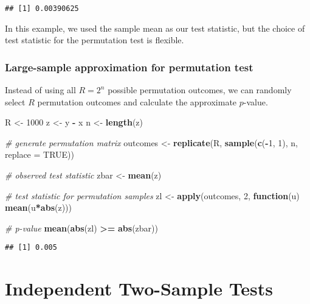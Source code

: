 \documentclass[
]{book}
\newenvironment{Shaded}{\begin{snugshade}}{\end{snugshade}}
\newcommand{\CommentTok}[1]{\textcolor[rgb]{0.56,0.35,0.01}{\textit{#1}}}
\newcommand{\ControlFlowTok}[1]{\textcolor[rgb]{0.13,0.29,0.53}{\textbf{#1}}}
\newcommand{\DataTypeTok}[1]{\textcolor[rgb]{0.13,0.29,0.53}{#1}}
\newcommand{\DecValTok}[1]{\textcolor[rgb]{0.00,0.00,0.81}{#1}}
\newcommand{\KeywordTok}[1]{\textcolor[rgb]{0.13,0.29,0.53}{\textbf{#1}}}
\newcommand{\NormalTok}[1]{#1}
\newcommand{\OperatorTok}[1]{\textcolor[rgb]{0.81,0.36,0.00}{\textbf{#1}}}
\newcommand{\OtherTok}[1]{\textcolor[rgb]{0.56,0.35,0.01}{#1}}
\newcommand{\StringTok}[1]{\textcolor[rgb]{0.31,0.60,0.02}{#1}}
\begin{document}
\begin{verbatim}
## [1] 0.00390625
\end{verbatim}

In this example, we used the sample mean as our test statistic,
but the choice of test statistic for the permutation test is flexible.

\hypertarget{large-sample-approximation-for-permutation-test}{%
\subsection{Large-sample approximation for permutation test}\label{large-sample-approximation-for-permutation-test}}

Instead of using all \(R = 2^n\) possible permutation outcomes,
we can randomly select \(R\) permutation outcomes and calculate the approximate \(p\)-value.

\begin{Shaded}
\begin{Highlighting}[]
\NormalTok{R <-}\StringTok{ }\DecValTok{1000}
\NormalTok{z <-}\StringTok{ }\NormalTok{y }\OperatorTok{-}\StringTok{ }\NormalTok{x}
\NormalTok{n <-}\StringTok{ }\KeywordTok{length}\NormalTok{(z)}

\CommentTok{# generate permutation matrix}
\NormalTok{outcomes <-}\StringTok{ }\KeywordTok{replicate}\NormalTok{(R, }\KeywordTok{sample}\NormalTok{(}\KeywordTok{c}\NormalTok{(}\OperatorTok{-}\DecValTok{1}\NormalTok{, }\DecValTok{1}\NormalTok{), n, }\DataTypeTok{replace =} \OtherTok{TRUE}\NormalTok{))}

\CommentTok{# observed test statistic}
\NormalTok{zbar <-}\StringTok{ }\KeywordTok{mean}\NormalTok{(z)}

\CommentTok{# test statistic for permutation samples}
\NormalTok{zl <-}\StringTok{ }\KeywordTok{apply}\NormalTok{(outcomes, }\DecValTok{2}\NormalTok{, }\ControlFlowTok{function}\NormalTok{(u) }\KeywordTok{mean}\NormalTok{(u}\OperatorTok{*}\KeywordTok{abs}\NormalTok{(z)))}

\CommentTok{# p-value}
\KeywordTok{mean}\NormalTok{(}\KeywordTok{abs}\NormalTok{(zl) }\OperatorTok{>=}\StringTok{ }\KeywordTok{abs}\NormalTok{(zbar))}
\end{Highlighting}
\end{Shaded}

\begin{verbatim}
## [1] 0.005
\end{verbatim}

\hypertarget{independent-two-sample-tests}{%
\chapter{Independent Two-Sample Tests}\label{independent-two-sample-tests}}
\end{document}
